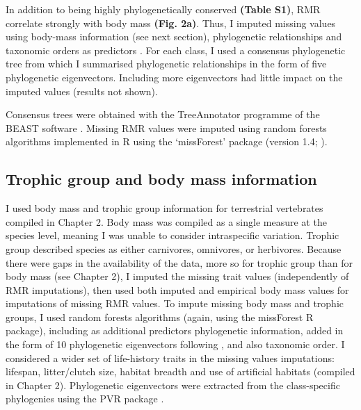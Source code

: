 In addition to being highly phylogenetically conserved \textbf{(Table S1)}, RMR correlate strongly with body mass \textbf{(Fig. 2a)}. Thus, I imputed missing values using body-mass information (see next section), phylogenetic relationships and taxonomic orders as predictors \citep{Penone2014}. For each class, I used a consensus phylogenetic tree from which I summarised phylogenetic relationships in the form of five phylogenetic eigenvectors. Including more eigenvectors had little impact on the imputed values (results not shown). 

Consensus trees were obtained with the TreeAnnotator programme of the BEAST software \citep{Bouckaert2014}. Missing RMR values were imputed using random forests algorithms implemented in R using the ‘missForest’ package (version 1.4; \citet{Stekhoven2012, Stekhoven2016}).  

\subsection{Trophic group and body mass information}

I used body mass and trophic group information for terrestrial vertebrates compiled in Chapter 2. Body mass was compiled as a single measure at the species level, meaning I was unable to consider intraspecific variation. Trophic group described species as either carnivores, omnivores, or herbivores. Because there were gaps in the availability of the data, more so for trophic group than for body mass (see Chapter 2), I imputed the missing trait values (independently of RMR imputations), then used both imputed and empirical body mass values for imputations of missing RMR values. To impute missing body mass and trophic groups, I used random forests algorithms (again, using the missForest R package), including as additional predictors phylogenetic information, added in the form of 10 phylogenetic eigenvectors \citep{DinizFilho2012} following \citet{Penone2014}, and also taxonomic order. I considered a wider set of life-history traits in the missing values imputations: lifespan, litter/clutch size, habitat breadth and use of artificial habitats (compiled in Chapter 2). Phylogenetic eigenvectors were extracted from the class-specific phylogenies using the PVR package \citep{Santos2018}.  

